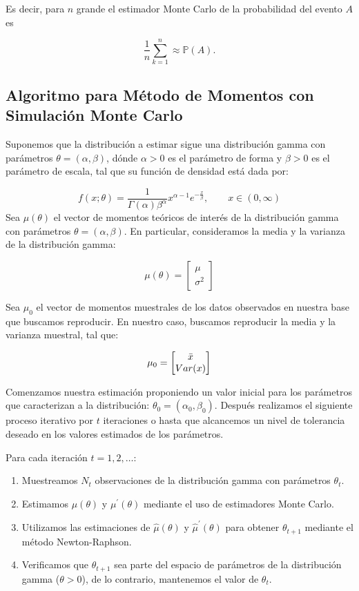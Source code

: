 \documentclass[9pt,twocolumn,twoside,]{pnas-new}
\begin{document}
Es decir, para \(n\) grande el estimador Monte Carlo de la probabilidad
del evento \(A\) es

\[\frac{1}{n}\sum_{k=1}^n \approx \mathbb{P}(A) .\]

\hypertarget{algoritmo-para-muxe9todo-de-momentos-con-simulaciuxf3n-monte-carlo}{%
\subsection{Algoritmo para Método de Momentos con Simulación Monte
Carlo}\label{algoritmo-para-muxe9todo-de-momentos-con-simulaciuxf3n-monte-carlo}}

Suponemos que la distribución a estimar sigue una distribución gamma con
parámetros \(\theta = (\alpha, \beta)\), dónde \(\alpha > 0\) es el
parámetro de forma y \(\beta > 0\) es el parámetro de escala, tal que su
función de densidad está dada por:

\[f(x;\theta) = \frac{1}{\Gamma(\alpha)\beta^{\alpha}}x^{\alpha-1}e^{-\frac{x}{\beta}}, \qquad x\in(0,\infty)\]
Sea \(\mu(\theta)\) el vector de momentos teóricos de interés de la
distribución gamma con parámetros \(\theta = (\alpha, \beta)\). En
particular, consideramos la media y la varianza de la distribución
gamma:

\[\mu(\theta) = \begin{bmatrix} \mu \\ \sigma^{2} \end{bmatrix}\]

Sea \(\mu_{0}\) el vector de momentos muestrales de los datos observados
en nuestra base que buscamos reproducir. En nuestro caso, buscamos
reproducir la media y la varianza muestral, tal que:

\[\mu_{0} = \begin{bmatrix} \Bar{x} \\ Var(x) \end{bmatrix}\]

Comenzamos nuestra estimación proponiendo un valor inicial para los
parámetros que caracterizan a la distribución:
\(\theta_{0} = (\alpha_{0}, \beta_{0})\). Después realizamos el
siguiente proceso iterativo por \(t\) iteraciones o hasta que alcancemos
un nivel de tolerancia deseado en los valores estimados de los
parámetros.

Para cada iteración \(t = 1, 2, \dots\):

\begin{enumerate}
    \item Muestreamos $N_{t}$ observaciones de la distribución gamma con parámetros $\theta_{t}$. 
    \item Estimamos $\mu(\theta)$ y $\mu^{\prime}(\theta)$ mediante el uso de estimadores Monte Carlo.
    \item Utilizamos las estimaciones de $\hat{\mu}(\theta)$ y $\hat{\mu}^{\prime}(\theta)$ para obtener $\theta_{t+1}$ mediante el método Newton-Raphson.
    \item Verificamos que $\theta_{t+1}$ sea parte del espacio de parámetros de la distribución gamma ($\theta > 0$), de lo contrario, mantenemos el valor de $\theta_{t}$.
\end{enumerate}
\end{document}
